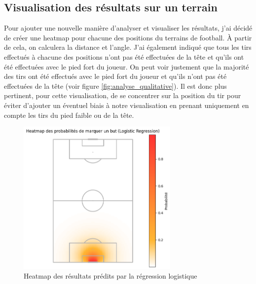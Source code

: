 \documentclass[12pt]{article}
\begin{document}
\newpage

\subsection{Visualisation des résultats sur un terrain}
Pour ajouter une nouvelle manière d'analyser et visualiser les résultats, j'ai décidé de créer une heatmap pour chacune des positions du terrains de football.
À partir de cela, on calculera la distance et l'angle. 
J'ai également indiqué que tous les tirs effectués à chacune des positions n'ont pas été effectuées de la tête et qu'ils ont été effectuées avec le pied fort du joueur.
On peut voir justement que la majorité des tirs ont été effectués avec le pied fort du joueur et qu'ils n'ont pas été effectuées de la tête (voir figure \ref{fig:analyse_qualitative}).
Il est donc plus pertinent, pour cette visualisation, de se concentrer sur la position du tir pour éviter d'ajouter un éventuel biais à notre visualisation en prenant uniquement en compte les tirs du pied faible ou de la tête.

\begin{figure}[htp]
    \centering
    \includegraphics[width=0.7\textwidth]{img/pitch_visualisation_log_reg.png}
    \caption{Heatmap des résultats prédits par la régression logistique}
    \label{fig:result_log_reg}
\end{figure}
\end{document}
